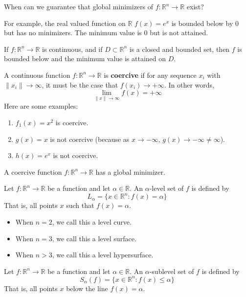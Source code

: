 \begin{problem}[Motivation]
  When can we guarantee that global minimizers of $f: \mathbb R^n \rightarrow \mathbb R$ exist?

  For example, the real valued function on $\mathbb R$ $f(x) = e^x$ is bounded below by 0 but has no minimizers. The minimum value is 0 but is not attained.
\end{problem}
\begin{proposition}
  If $f: \mathbb R^n \rightarrow \mathbb R$ is continuous, and if $D \subset \mathbb R^n$ is a closed and bounded set, then $f$ is bounded below and the minimum value is attained on $D$.
\end{proposition}
\begin{definition}
  A continuous function $f: \mathbb R^n \rightarrow \mathbb R$ is \textbf{coercive} if for any sequence $x_i$ with $\|x_i \| \rightarrow \infty$, it must be the case that $f(x_i) \rightarrow +\infty$. In other words, $$\lim_{\|x\| \rightarrow \infty} f(x) = +\infty$$
  Here are some examples:
  \begin{enumerate}
    \item $f_1(x) = x^2$ is coercive.
    \item $g(x) = x$ is not coercive (because as $x \rightarrow -\infty$, $g(x) \rightarrow -\infty \neq \infty$).
    \item $h(x) = e^x$ is not coercive.
  \end{enumerate}
\end{definition}
\begin{proposition}
  A coercive function $f: \mathbb R^n \rightarrow \mathbb R$ has a global minimizer.
\end{proposition}
\begin{definition}
  Let $f: \mathbb R^n \to \mathbb R$ be a function and let $\alpha \in \mathbb R$. An $\alpha$-level set of $f$ is defined by $$L_\alpha = \{x \in \mathbb R^n: f(x) = \alpha\}$$
  That is, all points $x$ such that $f(x) = \alpha$.
  \begin{itemize}
    \item When $n = 2$, we call this a level curve.
    \item When $n = 3$, we call this a level surface.
    \item When $n > 3$, we call this a level hypersurface.
  \end{itemize}
\end{definition}
\begin{definition}
  Let $f: \mathbb R^n \to \mathbb R$ be a function and let $\alpha \in \mathbb R$. An $\alpha$-sublevel set of $f$ is defined by $$S_\alpha(f) = \{x \in \mathbb R^n: f(x) \leq \alpha\}$$
  That is, all points $x$ below the line $f(x) = \alpha$.
\end{definition}
